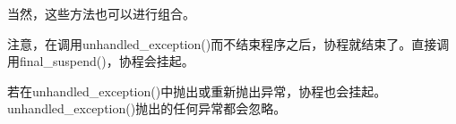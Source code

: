 当然，这些方法也可以进行组合。

注意，在调用unhandled\_exception()而不结束程序之后，协程就结束了。直接调用final\_suspend()，协程会挂起。

若在unhandled\_exception()中抛出或重新抛出异常，协程也会挂起。unhandled\_exception()抛出的任何异常都会忽略。










































